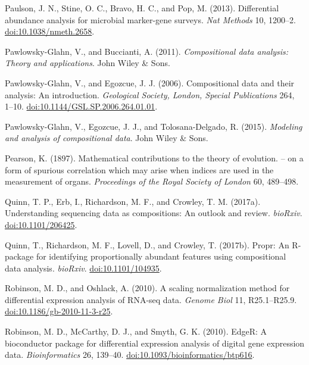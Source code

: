 \documentclass[twocolumn]{article}
\begin{document}
Paulson, J. N., Stine, O. C., Bravo, H. C., and Pop, M. (2013).
Differential abundance analysis for microbial marker-gene surveys.
\emph{Nat Methods} 10, 1200--2.
\href{http://doi.org/10.1038/nmeth.2658}{doi:10.1038/nmeth.2658}.

Pawlowsky-Glahn, V., and Buccianti, A. (2011). \emph{Compositional data
analysis: Theory and applications}. John Wiley \& Sons.

Pawlowsky-Glahn, V., and Egozcue, J. J. (2006). Compositional data and
their analysis: An introduction. \emph{Geological Society, London,
Special Publications} 264, 1--10.
\href{http://doi.org/10.1144/GSL.SP.2006.264.01.01}{doi:10.1144/GSL.SP.2006.264.01.01}.

Pawlowsky-Glahn, V., Egozcue, J. J., and Tolosana-Delgado, R. (2015).
\emph{Modeling and analysis of compositional data}. John Wiley \& Sons.

Pearson, K. (1897). Mathematical contributions to the theory of
evolution. -- on a form of spurious correlation which may arise when
indices are used in the measurement of organs. \emph{Proceedings of the
Royal Society of London} 60, 489--498.

Quinn, T. P., Erb, I., Richardson, M. F., and Crowley, T. M. (2017a).
Understanding sequencing data as compositions: An outlook and review.
\emph{bioRxiv}.
\href{http://doi.org/10.1101/206425}{doi:10.1101/206425}.

Quinn, T., Richardson, M. F., Lovell, D., and Crowley, T. (2017b).
Propr: An R-package for identifying proportionally abundant features
using compositional data analysis. \emph{bioRxiv}.
\href{http://doi.org/10.1101/104935}{doi:10.1101/104935}.

Robinson, M. D., and Oshlack, A. (2010). A scaling normalization method
for differential expression analysis of RNA-seq data. \emph{Genome Biol}
11, R25.1--R25.9.
\href{http://doi.org/10.1186/gb-2010-11-3-r25}{doi:10.1186/gb-2010-11-3-r25}.

Robinson, M. D., McCarthy, D. J., and Smyth, G. K. (2010). EdgeR: A
bioconductor package for differential expression analysis of digital
gene expression data. \emph{Bioinformatics} 26, 139--40.
\href{http://doi.org/10.1093/bioinformatics/btp616}{doi:10.1093/bioinformatics/btp616}.
\end{document}
